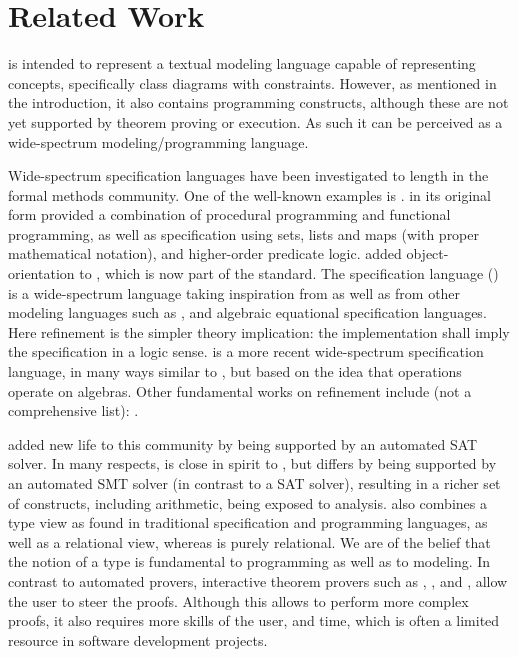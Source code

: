 
\section{Related Work}
\label{sec:related-work}

\Klang{} is intended to represent a textual modeling language capable
of representing \sysml{} concepts, specifically class diagrams with
constraints.  However, as mentioned in the introduction, it also
contains programming constructs, although these are not yet supported by theorem proving or execution.  As such it can be perceived as a
wide-spectrum modeling/programming language.

Wide-spectrum specification languages have been investigated to length
in the formal methods community. One of the well-known examples is
\vdm{} \cite{vdm78,bjoerner-jones-82,jones90,jones-shaw-90}. \vdm{} in
its original form \cite{vdm78} provided a combination of procedural
programming and functional programming, as well as specification using
sets, lists and maps (with proper mathematical notation), and
higher-order predicate logic. \vdmpp{} \cite{vdmplusplus05} added
object-orientation to \vdm{}, which is now part of the \vdm{}
standard. The \raiselang{} specification language (\rsl{})
\cite{raise92} is a wide-spectrum language taking inspiration from
\vdm{} as well as from other modeling languages such as \zlang{}
\cite{spivey-Z-1988}, and algebraic equational specification
languages. Here refinement is the simpler theory implication: the
implementation shall imply the specification in a logic sense. \asml{}
\cite{asml05} is a more recent wide-spectrum specification language,
in many ways similar to \vdm{}, but based on the idea
that operations operate on algebras.  Other fundamental works on
refinement include (not a comprehensive list):
\cite{wirth-refinement-71,hoare-sanders-refinement-86,morgan-refinement-94,woodcock-sanders-z-96,back-wright-refinement-98,abrial-eventb-10}.

\alloy{} \cite{jackson-alloy-12} added new life to this community by
being supported by an automated SAT solver. In many respects, \Klang{}
is close in spirit to \alloy{}, but differs by being supported by an
automated SMT solver (in contrast to a SAT solver), resulting in a
richer set of constructs, including arithmetic, being exposed to
analysis. \Klang{} also combines a type view as found in traditional
specification and programming languages, as well as a relational view,
whereas \alloy{} is purely relational. We are of the belief that the
notion of a type is fundamental to programming as well as to
modeling. In contrast to automated provers, interactive theorem
provers such as \pvs{} \cite{cade92-pvs,pvs-website}, \coq{}
\cite{coq-website}, and \isabelle{} \cite{isabelle-website}, allow the
user to steer the proofs.  Although this allows to perform more
complex proofs, it also requires more skills of the user, and time,
which is often a limited resource in software development projects.

